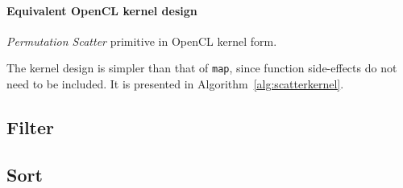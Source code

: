 \paragraph*{Equivalent \ac{OpenCL} kernel design}
\begin{algorithm}
  \caption{\emph{Permutation Scatter} primitive in \ac{OpenCL} kernel form.}
  \label{alg:scatterkernel}
  \begin{algorithmic}
    \EndFunction
  \end{algorithmic}
\end{algorithm}

The kernel design is simpler than that of \verb|map|, since function side-effects do not need to be included. It is presented in Algorithm~\ref{alg:scatterkernel}.

\subsection{Filter}

\subsection{Sort}
